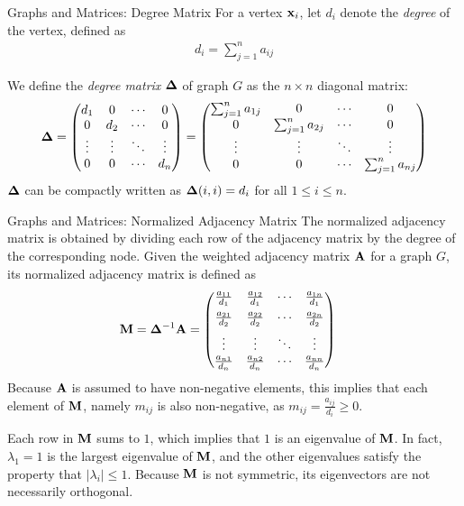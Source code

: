 \begin{frame}{Graphs and Matrices: Degree Matrix}
For a vertex $\mathbf{x}_i$, let $d_i$ denote the {\em degree} of the
vertex, def\/{i}ned as
\begin{align*}
    d_i = \sum_{j=1}^n a_{ij}
\end{align*}

We def\/{i}ne the {\em
degree matrix} ${\bm \Delta}$ of graph $G$ as the $n \times n$ diagonal
matrix:
\begin{align*}
    \bDelta = \matr{
      d_1 & 0 & \cdots & 0 \\
      0 & d_2 & \cdots & 0\\
      \vdots & \vdots & \ddots & \vdots\\
      0 & 0 &\cdots  & d_n \\
    } =
    \matr{
      \sum_{j=1}^n a_{1j} & 0 & \cdots & 0 \\
      0 & \sum_{j=1}^n a_{2j} & \cdots & 0\\
      \vdots & \vdots & \ddots & \vdots\\
      0 & 0 &\cdots  & \sum_{j=1}^n a_{nj} \\
    }
\end{align*}
${\bm \Delta}$ can be compactly written as ${\bm \Delta}(i,i) = d_i$ for all
$1 \le i \le n$.
\end{frame}



\begin{frame}{Graphs and Matrices: Normalized Adjacency Matrix}
The normalized adjacency
matrix is obtained by dividing each row of the adjacency matrix by
the degree of the corresponding node. Given the weighted 
adjacency
matrix $\mathbf{A}$ for a graph $G$, its normalized adjacency matrix is
def\/{i}ned as
\begin{align*}
    \bM =  \bDelta^{-1} \bA & =
    \matr{
        {a_{11}\over d_1} &  {a_{12}\over d_1} &
        \cdots &  {a_{1n}\over d_1}\\[1ex]
        {a_{21}\over d_2} &  {a_{22}\over d_2} &
        \cdots &  {a_{2n}\over d_2}\\[1ex]
        \vdots & \vdots & \ddots & \vdots\\
        {a_{n1}\over d_n} &  {a_{n2}\over d_n} & \cdots &
        {a_{nn}\over d_n}\\
    }
\end{align*}
Because $\mathbf{A}$ is assumed to have non-negative elements, this implies
that each element of $\mathbf{M}$, namely $m_{ij}$ is also non-negative,
as $m_{ij} = \tfrac{a_{ij}}{d_i} \ge 0$. 


\medskip
Each row in $\mathbf{M}$ sums to $1$, which implies that $1$ is an
eigenvalue of $\mathbf{M}$. In fact, $\lambda_1 = 1$ is the largest
eigenvalue of $\mathbf{M}$, and the other eigenvalues satisfy the
property that $|\lambda_i| \le 1$. 
Because $\mathbf{M}$
is not symmetric, its eigenvectors are not necessarily orthogonal.
\end{frame}


